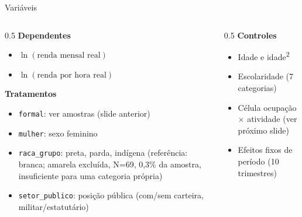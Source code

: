 \documentclass[aspectratio=169]{beamer}
\begin{document}
\begin{frame}{Vari\'aveis}
  \footnotesize
  \begin{columns}[T]
    \begin{column}{0.5\linewidth}
      \textbf{Dependentes}
      \begin{itemize}
        \item $\ln(\text{renda mensal real})$
        \item $\ln(\text{renda por hora real})$
      \end{itemize}
      \vspace{2mm}
      \textbf{Tratamentos}
      \begin{itemize}
        \item \texttt{formal}: ver amostras (slide anterior)
        \item \texttt{mulher}: sexo feminino
        \item \texttt{raca\_grupo}: preta, parda, ind\'igena (refer\^encia: branca; amarela exclu\'ida, N=69, 0,3\% da amostra, insuficiente para uma categoria pr\'opria)
        \item \texttt{setor\_publico}: posi\c{c}\~ao p\'ublica (com/sem carteira, militar/estatut\'ario)
      \end{itemize}
    \end{column}
    \begin{column}{0.5\linewidth}
      \textbf{Controles}
      \begin{itemize}
        \item Idade e idade\textsuperscript{2}
        \item Escolaridade (7 categorias)
        \item C\'elula ocupa\c{c}\~ao $\times$ atividade (ver pr\'oximo slide)
        \item Efeitos fixos de per\'iodo (10 trimestres)
      \end{itemize}
    \end{column}
  \end{columns}
\end{frame}
\end{document}
